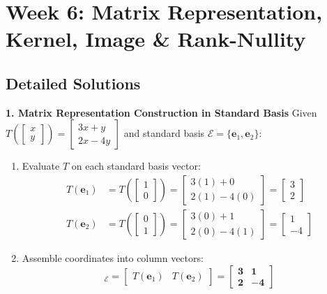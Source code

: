 \section*{Week 6: Matrix Representation, Kernel, Image \& Rank-Nullity}

\subsection*{Detailed Solutions}

\textbf{1. Matrix Representation Construction in Standard Basis}
Given $T\left(\begin{bmatrix} x \\ y \end{bmatrix}\right) = \begin{bmatrix} 3x + y \\ 2x - 4y \end{bmatrix}$ and standard basis $\mathcal{E} = \{\mathbf{e}_1, \mathbf{e}_2\}$:
\begin{enumerate}
    \item Evaluate $T$ on each standard basis vector:
    \begin{align*}
    T(\mathbf{e}_1) &= T\left(\begin{bmatrix} 1 \\ 0 \end{bmatrix}\right) = \begin{bmatrix} 3(1) + 0 \\ 2(1) - 4(0) \end{bmatrix} = \begin{bmatrix} 3 \\ 2 \end{bmatrix} \\
    T(\mathbf{e}_2) &= T\left(\begin{bmatrix} 0 \\ 1 \end{bmatrix}\right) = \begin{bmatrix} 3(0) + 1 \\ 2(0) - 4(1) \end{bmatrix} = \begin{bmatrix} 1 \\ -4 \end{bmatrix}
    \end{align*}
    \item Assemble coordinates into column vectors:
    \begin{equation*}
    [T]_{\mathcal{E}} = \begin{bmatrix} T(\mathbf{e}_1) & T(\mathbf{e}_2) \end{bmatrix} = \mathbf{\begin{bmatrix} 3 & 1 \\ 2 & -4 \end{bmatrix}}
    \end{equation*}
\end{enumerate}

